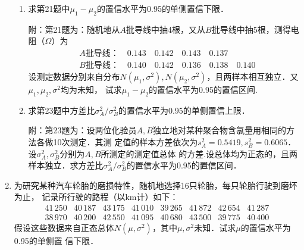 \documentclass[10pt,a4paper]{article}
\begin{document}
\begin{enumerate}
\begin{enumerate}
        \item 求第21题中$\mu_1-\mu_2$的置信水平为0.95的单侧置信下限．
        
        {\kaishu 附：第21题为：随机地从$A$批导线中抽4根，又从$B$批导线中抽5根，测得电阻（$\Omega$）为
        \begin{equation}
            \begin{split}
                & A\mbox{批导线：} \quad  0.143 \quad 0.142 \quad 0.143 \quad 0.137\\
                & B\mbox{批导线：} \quad  0.140 \quad 0.142 \quad 0.136 \quad 0.138 \quad 0.140
            \end{split}
            \nonumber
        \end{equation}
        设测定数据分别来自分布$N(\mu_1,\sigma^2),N(\mu_2,\sigma^2)$，且两样本相互独立．又$\mu_1,\mu_2,\sigma^2$均为未知，
        试求$\mu_1-\mu_2$的置信水平为0.95的置信区间.}

        \item 求第23题中方差比$\sigma_A^2/\sigma_B^2$的置信水平为0.95的单侧置信上限．
        
        {\kaishu 附：第23题为：设两位化验员$A, B$独立地对某种聚合物含氯量用相同的方法各做10次测定．其测
        定值的样本方差依次为$s_A^2=0.5419,s_B^2=0.6065$．设$\sigma_A^2,\sigma_B^2$分别为$A,B$所测定的测定值总体
        的方差.设总体均为正态的，且两样本独立．求方差比$\sigma_A^2/\sigma_B^2$的置信水平为0.95的置信区间．}
    \end{enumerate}




    \item 为研究某种汽车轮胎的磨损特性，随机地选择16只轮胎，每只轮胎行驶到磨坏为止，
    记录所行驶的路程（以km计）如下：
    $$\begin{array}{cccccccc}
        41\, 250 & 40\, 187 & 43\, 175 & 41\, 010 & 39\, 265 & 41\, 872 & 42\, 654 & 41\, 287\\
        38\, 970 & 40\, 200 & 42\, 550 & 41\, 095 & 40\, 680 & 43\, 500 & 39\, 775 & 40\, 400 
    \end{array}$$
    假设这些数据来自正态总体$N(\mu,\sigma^2)$，其中$\mu,\sigma^2$未知．试求$\mu$的置信水平为0.95的单侧置
    信下限．




\end{enumerate}
\end{document}
